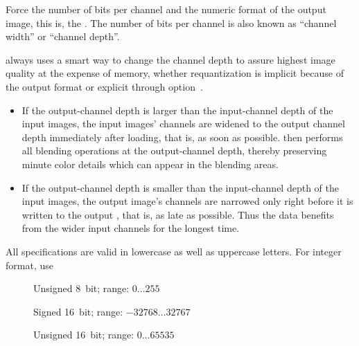 \begin{codelist}
  \label{opt:depth}%
\item[\itempar{-d \metavar{DEPTH} \\ --depth=\metavar{DEPTH}}]\itemend
  Force the number of bits per channel and the numeric format of the output image, this is, the
  .  The number of bits per channel is also known as ``channel width'' or
  ``channel depth''.

  \App{} always uses a smart way to change the channel depth to assure highest image quality at
  the expense of memory, whether requantization is implicit because of the output format or
  explicit through option~.

  \begin{itemize}
  \item
    If the output-channel depth is larger than the input-channel depth of the input images, the
    input images' channels are widened to the output channel depth immediately after loading,
    that is, as soon as possible.  \App{} then performs all blending operations at the
    output-channel depth, thereby preserving minute color details which can appear in the
    blending areas.

  \item
    If the output-channel depth is smaller than the input-channel depth of the input images, the
    output image's channels are narrowed only right before it is written to the output
    , that is, as late as possible.  Thus the data benefits from the wider input
    channels for the longest time.
  \end{itemize}

  All  specifications are valid in lowercase as well as uppercase letters.  For
  integer format, use

  \begin{description}
  \item[]\itemend
    Unsigned 8~bit; range: $0\dots255$

  \item[]\itemend
    Signed 16~bit; range: $-32768\dots32767$

  \item[]\itemend
    Unsigned 16~bit; range: $0\dots65535$


\end{description}
\end{codelist}
